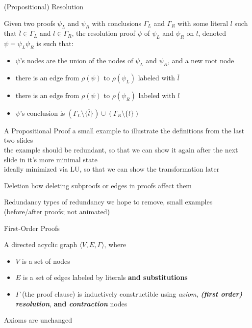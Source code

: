 \documentclass{beamer}
\begin{document}
\begin{frame}{(Propositional) Resolution}
\begin{definition}[Resolution]
Given two proofs $\psi_L$ and $\psi_R$ with conclusions $\Gamma_L$ and $\Gamma_R$ with some literal $l$ such that $\overline{l}\in \Gamma_L$ and $l\in \Gamma_R$, the resolution proof $\psi$ of $\psi_L$ and $\psi_R$ on $l$, denoted $\psi=\psi_L \psi_R$ is such that:
\begin{itemize}
\item $\psi$'s nodes are the union of the nodes of $\psi_L$ and $\psi_R$, and a new root node
\item there is an edge from $\rho(\psi)$ to $\rho(\psi_L)$ labeled with $\overline{l}$
\item there is an edge from $\rho(\psi)$ to $\rho(\psi_R)$ labeled with $l$
\item $\psi$'s conclusion is $(\Gamma_L\setminus\{\overline{l}\})\cup(\Gamma_R\setminus\{l\})$
\end{itemize}
\end{definition}
\end{frame}

\begin{frame}{A Propositional Proof}
a small example to illustrate the definitions from the last two slides\\
the example should be redundant, so that we can show it again after the next slide in it's more minimal state\\
ideally minimized via LU, so that we can show the transformation later
\end{frame}


\begin{frame}{Deletion}
how deleting subproofs or edges in proofs affect them
\end{frame}

\begin{frame}{Redundancy}
types of redundancy we hope to remove, small examples (before/after proofs; not animated)
\end{frame}

\begin{frame}{First-Order Proofs}
\begin{definition}
A directed acyclic graph $\langle V,E,\Gamma \rangle$, where
\begin{itemize}
\item $V$ is a set of nodes
\item $E$ is a set of edges labeled by literals {\bf and substitutions}
\item $\Gamma$ (the proof clause) is inductively constructible using \emph{axiom}, {\bf\emph{(first order) resolution}}, {\bf and \emph{contraction}} nodes
\end{itemize}
\end{definition}

Axioms are unchanged
\end{frame}
\end{document}
